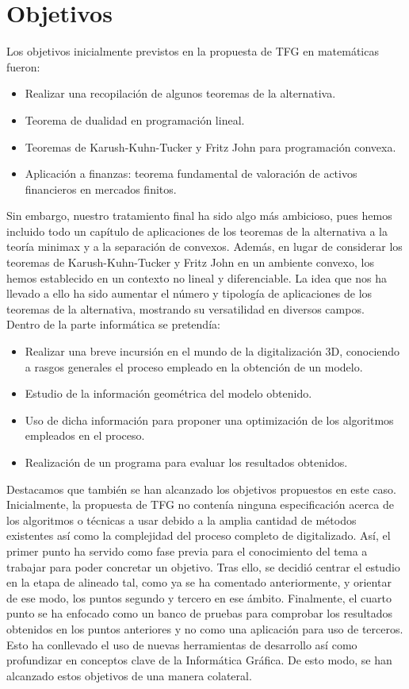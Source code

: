 \chapter{Objetivos}
Los objetivos inicialmente previstos en la propuesta de TFG en matemáticas fueron:
\begin{itemize}
\item Realizar una recopilación de algunos teoremas de la alternativa.
\item Teorema de dualidad en programación lineal.
\item Teoremas de Karush-Kuhn-Tucker y Fritz John para programación convexa.
\item Aplicación a finanzas: teorema fundamental de valoración de activos financieros en mercados finitos.
\end{itemize}

Sin embargo, nuestro tratamiento final ha sido algo más ambicioso, pues hemos incluido todo un capítulo de aplicaciones de los teoremas de la alternativa a la teoría minimax y a la separación de convexos. Además, en lugar de considerar los teoremas de Karush-Kuhn-Tucker y Fritz John en un ambiente convexo, los hemos establecido en un contexto no lineal y diferenciable. La idea que nos ha llevado a ello ha sido aumentar el número y tipología de aplicaciones de los teoremas de la alternativa, mostrando su versatilidad en diversos campos.\\

Dentro de la parte informática se pretendía:
\begin{itemize}
	\item Realizar una breve incursión en el mundo de la digitalización 3D, conociendo a rasgos generales el proceso empleado en la obtención de un modelo.
	\item Estudio de la información geométrica del modelo obtenido.
	\item Uso de dicha información para proponer una optimización de los algoritmos empleados en el proceso.
	\item Realización de un programa para evaluar los resultados obtenidos.
\end{itemize}

Destacamos que también se han alcanzado los objetivos propuestos en este caso. Inicialmente, la propuesta de TFG no contenía ninguna especificación acerca de los algoritmos o técnicas a usar debido a la amplia cantidad de métodos existentes así como la complejidad del proceso completo de digitalizado. Así, el primer punto ha servido como fase previa para el conocimiento del tema a trabajar para poder concretar un objetivo. Tras ello, se decidió centrar el estudio en la etapa de alineado tal, como ya se ha comentado anteriormente, y orientar de ese modo, los puntos segundo y tercero en ese ámbito. Finalmente, el cuarto punto se ha enfocado como un banco de pruebas para comprobar los resultados obtenidos en los puntos anteriores y no como una aplicación para uso de terceros. Esto ha conllevado el uso de nuevas herramientas de desarrollo así como profundizar en conceptos clave de la Informática Gráfica. De esto modo, se han alcanzado estos objetivos de una manera colateral. 